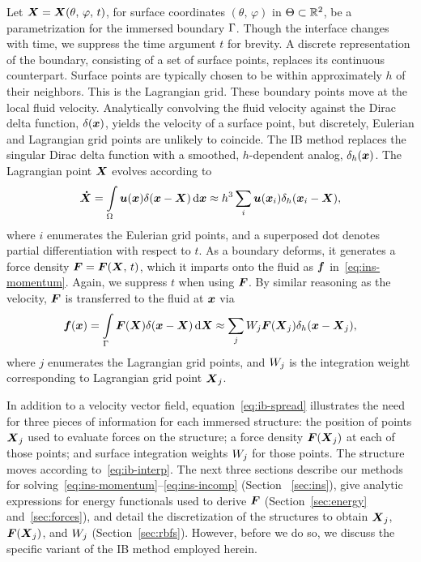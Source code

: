 Let $\boldsymbol{X} = \boldsymbol{X}(\theta,\,\varphi,\,t)$, for surface coordinates $(\theta,\,\varphi)$ in
$\Theta\subset\mathbb{R}^2$, be a parametrization for the immersed boundary $\Gamma$.
Though the interface changes with time, we suppress the time argument $t$ for brevity. A
discrete representation of the boundary, consisting of a set of surface points, replaces
its continuous counterpart.  Surface points are typically chosen to be within
approximately $h$ of their neighbors.  This is the Lagrangian grid. These boundary points
move at the local fluid velocity.  Analytically convolving the fluid velocity against the
Dirac delta function, $\delta(\boldsymbol{x})$, yields the velocity of a surface point, but
discretely, Eulerian and Lagrangian grid points are unlikely to coincide. The IB method
replaces the singular Dirac delta function with a smoothed, $h$-dependent analog,
$\delta_h(\boldsymbol{x})$. The Lagrangian point $\boldsymbol{X}$ evolves according to
\begin{equation}\label{eq:ib-interp}
    \vec{\dot{X}}
        = \int\limits_{\domain} \u(\x) \Dirac(\x-\X) \d\x
        \approx h^3 \sum_{i} \u(\x_i) \Dirac_h(\x_i-\X),
\end{equation}
where $i$ enumerates the Eulerian grid points, and a superposed dot denotes partial
differentiation with respect to $t$. As a boundary deforms, it generates a force density
$\boldsymbol{F} = \boldsymbol{F}(\boldsymbol{X},\,t)$, which it imparts onto the fluid as $\boldsymbol{f}$ in~\eqref{eq:ins-momentum}.
Again, we suppress $t$ when using $\boldsymbol{F}$. By similar reasoning as the velocity, $\boldsymbol{F}$ is
transferred to the fluid at $\boldsymbol{x}$ via
\begin{equation}\label{eq:ib-spread}
        \f(\x)
        = \int\limits_{\interface} \F(\X)\Dirac(\x-\X) \d\X
        \approx \sum_{j} \weight[j]\F(\X_j) \Dirac_h(\x-\X_j),
\end{equation}
where $j$ enumerates the Lagrangian grid points, and $\weight[j]$ is the integration
weight corresponding to Lagrangian grid point $\boldsymbol{X}_j$. 

In addition to a velocity vector field, equation~\eqref{eq:ib-spread} illustrates the
need for three pieces of information for each immersed structure: the position of points
$\boldsymbol{X}_j$ used to evaluate forces on the structure; a force density $\boldsymbol{F}(\boldsymbol{X}_j)$ at each of
those points; and surface integration weights $\weight[j]$ for those points. The
structure moves according to~\eqref{eq:ib-interp}. The next three sections describe our
methods for solving~\eqref{eq:ins-momentum}--\eqref{eq:ins-incomp} (Section~%
\ref{sec:ins}), give analytic expressions for energy functionals used to derive $\boldsymbol{F}$
(Section~\ref{sec:energy} and~\ref{sec:forces}), and detail the discretization of the
structures to obtain $\boldsymbol{X}_j$, $\boldsymbol{F}(\boldsymbol{X}_j)$, and $\weight[j]$ (Section~\ref{sec:rbfs}).
However, before we do so, we discuss the specific variant of the IB method employed
herein.

